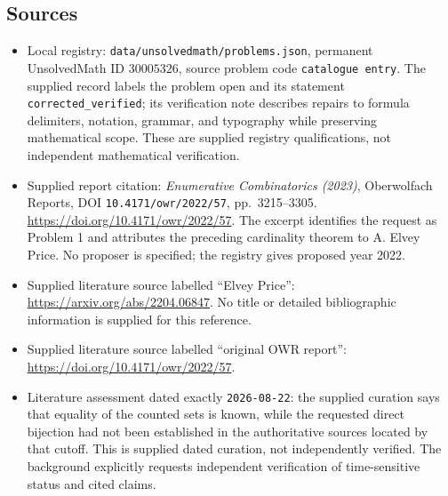 \documentclass[11pt]{article}
\begin{document}
\subsection{Sources}
\begin{itemize}
\item Local registry: \texttt{data/unsolvedmath/problems.json}, permanent UnsolvedMath ID \(30005326\), source problem code \texttt{catalogue entry}. The supplied record labels the problem open and its statement \texttt{corrected\_verified}; its verification note describes repairs to formula delimiters, notation, grammar, and typography while preserving mathematical scope. These are supplied registry qualifications, not independent mathematical verification.
\item Supplied report citation: \emph{Enumerative Combinatorics (2023)}, Oberwolfach Reports, DOI \texttt{10.4171/owr/2022/57}, pp.\ 3215--3305. \url{https://doi.org/10.4171/owr/2022/57}. The excerpt identifies the request as Problem 1 and attributes the preceding cardinality theorem to A. Elvey Price. No proposer is specified; the registry gives proposed year 2022.
\item Supplied literature source labelled ``Elvey Price'': \url{https://arxiv.org/abs/2204.06847}. No title or detailed bibliographic information is supplied for this reference.
\item Supplied literature source labelled ``original OWR report'': \url{https://doi.org/10.4171/owr/2022/57}.
\item Literature assessment dated exactly \texttt{2026-08-22}: the supplied curation says that equality of the counted sets is known, while the requested direct bijection had not been established in the authoritative sources located by that cutoff. This is supplied dated curation, not independently verified. The background explicitly requests independent verification of time-sensitive status and cited claims.
\end{itemize}
\end{document}
